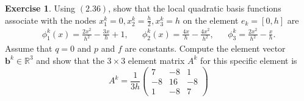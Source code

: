\documentclass{amsart}
\theoremstyle{plain}
\theoremstyle{definition}
\newtheorem{exer}{Exercise}[section]
\newcommand{\R}{\mathbb{R}}
\begin{document}
\begin{exer}
    Using $(2.36)$, show that the local quadratic basis functions associate with the nodes $x_1^k = 0, x_2^k = \frac{h}{2}, x_3^k = h$ on the element $e_k = [0,h]$ are 
    \begin{align*}
        \phi_1^k(x) = \frac{2x^2}{h^2}-\frac{3x}{h}+ 1, && \phi_2^k(x) = \frac{4x}{h}-\frac{4x^2}{h^2}, && \phi_3^k = \frac{2x^2}{h^2}-\frac{x}{h}.
    \end{align*}
    Assume that $q=0$ and $p$ and $f$ are constants. Compute the element vector $\mathbf{b}^k \in \R^3$ and show that the $3\times3$ element matrix $A^k$ for this specific element is 
    $$A^k = \frac{1}{3h}\begin{pmatrix}
        7 & -8 & 1 \\ -8 & 16 & -8\\ 1 & -8 & 7 
    \end{pmatrix}$$
\end{exer}
\end{document}
